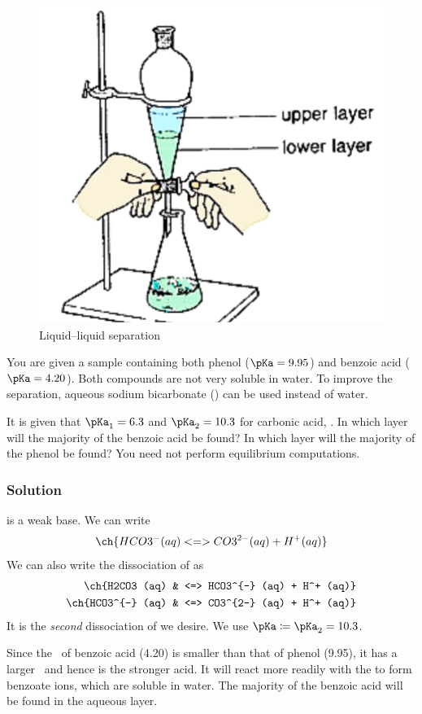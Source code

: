 \documentclass[12pt, a4paper, twoside]{pancake-book}
\renewcommand*{\it}[1]{\textit{#1}}
\begin{document}
\begin{figure}
	\centering
	\includegraphics[width=0.5\linewidth]{assets/08_ll_separation.png}
	\caption{Liquid--liquid separation}
	\label{fig:ll-sep}
\end{figure}

You are given a sample containing both phenol (\(\pKa = \num{9.95}\)) and benzoic
acid (\(\pKa = \num{4.20}\)). Both compounds are not very soluble in water. To
improve the separation, aqueous sodium bicarbonate () can be used instead
of water.

It is given that \(\pKa_1 = \num{6.3}\) and \(\pKa_2 = \num{10.3}\) for carbonic
acid, . In which layer will the majority of the benzoic acid be found?
In which layer will the majority of the phenol be found? You need not perform
equilibrium computations.

\subsubsection{Solution}
 is a weak base. We can write
\begin{equation*}
	\ch{HCO3^- (aq) <=> CO3^{2-} (aq) + H^+ (aq)}
\end{equation*}
We can also write the dissociation of  as
\begin{align*}
	\ch{H2CO3 (aq)    & <=> HCO3^{-} (aq) + H^+ (aq)} \\
	\ch{HCO3^{-} (aq) & <=> CO3^{2-} (aq) + H^+ (aq)}
\end{align*}
It is the \it{second} dissociation of  we desire. We use
\(\pKa \coloneqq \pKa_2 = \num{10.3}\).

Since the \pKa\ of benzoic acid (\num{4.20}) is smaller than that of phenol
(\num{9.95}), it has a larger \Ka\ and hence is the stronger acid. It will react
more readily with the  to form benzoate ions, which are soluble
in water. {\color{accent} The majority of the benzoic acid will be found in the
		aqueous layer.}
\end{document}
